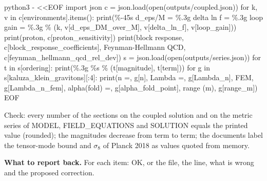 \documentclass[
  10pt,
]{article}
\newenvironment{Shaded}{}{}
\newcommand{\NormalTok}[1]{#1}
\begin{document}
\begin{Shaded}
\begin{Highlighting}[]
\NormalTok{python3 {-} \textless{}\textless{}\textquotesingle{}EOF\textquotesingle{}}
\NormalTok{import json}
\NormalTok{c = json.load(open(\textquotesingle{}outputs/coupled.json\textquotesingle{}))}
\NormalTok{for k, v in c[\textquotesingle{}environments\textquotesingle{}].items():}
\NormalTok{    print(\textquotesingle{}\%{-}45s d\_eps/M = \%.3g  delta ln f = \%.3g  loop gain = \%.3g\textquotesingle{} \% (k, v[\textquotesingle{}d\_eps\_DM\_over\_M\textquotesingle{}], v[\textquotesingle{}delta\_ln\_f\textquotesingle{}], v[\textquotesingle{}loop\_gain\textquotesingle{}]))}
\NormalTok{print(\textquotesingle{}proton\textquotesingle{}, c[\textquotesingle{}proton\_sensitivity\textquotesingle{}])}
\NormalTok{print(\textquotesingle{}block response\textquotesingle{}, c[\textquotesingle{}block\_response\_coefficients\textquotesingle{}], \textquotesingle{} Feynman{-}Hellmann QCD\textquotesingle{}, c[\textquotesingle{}feynman\_hellmann\_qcd\_rel\_dev\textquotesingle{}])}
\NormalTok{s = json.load(open(\textquotesingle{}outputs/series.json\textquotesingle{}))}
\NormalTok{for t in s[\textquotesingle{}ordering\textquotesingle{}]:}
\NormalTok{    print(\textquotesingle{}\%.3g  \%s\textquotesingle{} \% (t[\textquotesingle{}magnitude\textquotesingle{}], t[\textquotesingle{}term\textquotesingle{}]))}
\NormalTok{for g in s[\textquotesingle{}kaluza\_klein\_gravitons\textquotesingle{}][:4]:}
\NormalTok{    print(\textquotesingle{}n =\textquotesingle{}, g[\textquotesingle{}n\textquotesingle{}], \textquotesingle{} Lambda =\textquotesingle{}, g[\textquotesingle{}Lambda\_n\textquotesingle{}], \textquotesingle{} FEM\textquotesingle{}, g[\textquotesingle{}Lambda\_n\_fem\textquotesingle{}], \textquotesingle{} alpha(fold) =\textquotesingle{}, g[\textquotesingle{}alpha\_fold\_point\textquotesingle{}], \textquotesingle{} range (m)\textquotesingle{}, g[\textquotesingle{}range\_m\textquotesingle{}])}
\NormalTok{EOF}
\end{Highlighting}
\end{Shaded}

Check: every number of the sections on the coupled solution and on the
metric series of MODEL, FIELD\_EQUATIONS and SOLUTION equals the printed
value (rounded); the magnitudes decrease from term to term; the
documents label the tensor-mode bound and \(\sigma_8\) of Planck 2018 as
values quoted from memory.

\textbf{What to report back.} For each item: OK, or the file, the line,
what is wrong and the proposed correction.
\end{document}
